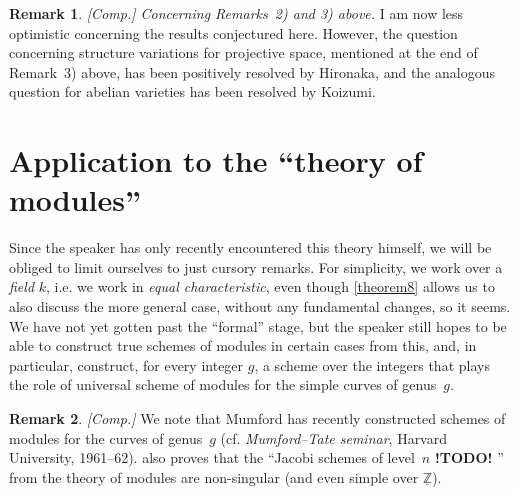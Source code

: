 \documentclass{article}
\theoremstyle{plain}
\theoremstyle{definition}
\newtheorem*{remark}{Remark}
\newcommand{\ZZ}{\mathbb{Z}}
\newcommand{\todo}{\textbf{ !TODO! }}
\newcommand{\oldpage}[1]{\marginpar{\footnotesize$\Big\vert$ \textit{p.~#1}}}
\begin{document}
\begin{remark}
  \emph{[Comp.] Concerning Remarks~2) and 3) above.}
  I am now less optimistic concerning the results conjectured here.
  However, the question concerning structure variations for projective space, mentioned at the end of Remark~3) above, has been positively resolved by Hironaka, and the analogous question for abelian varieties has been resolved by Koizumi.
\end{remark}


\section{Application to the ``theory of modules''}
\label{section7}

Since the speaker has only recently encountered this theory himself, we will be obliged to limit ourselves to just cursory remarks.
For simplicity, we work over a \emph{field} $k$, i.e. we work in \emph{equal characteristic}, even though \cref{theorem8} allows us to also discuss the more general case, without any fundamental changes, so it seems.
We have not yet gotten past the ``formal'' stage, but the speaker still hopes to be able to construct true schemes of modules
\oldpage{182-16}
in certain cases from this, and, in particular, construct, for every integer $g$, a scheme over the integers that plays the role of universal scheme of modules for the simple curves of genus~$g$.

\begin{remark}
  \emph{[Comp.]}
  We note that Mumford has recently constructed schemes of modules for the curves of genus~$g$ (cf. \emph{Mumford--Tate seminar}, Harvard University, 1961--62).
   also proves that the ``Jacobi schemes of level~$n$\todo'' from the theory of modules are non-singular (and even simple over $\underline{\ZZ}$).
\end{remark}
\end{document}

